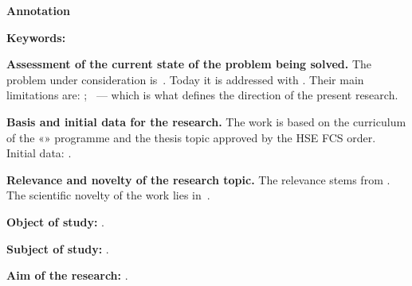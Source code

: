 \documentclass[12pt,a4paper]{extarticle}
\begin{document}
\sloppy



\begin{center}
  \textbf{\large Annotation}
\end{center}

\vspace{0.4em}

\noindent\textbf{Keywords:} 

\medskip
\noindent\textbf{Assessment of the current state of the problem being solved.} The problem under consideration is~. Today it is addressed with  \cite{example-en}. Their main limitations are: ; ~--- which is what defines the direction of the present research.

\medskip
\noindent\textbf{Basis and initial data for the research.} The work is based on the curriculum of the «\hseSpecialization» programme and the thesis topic approved by the HSE FCS order. Initial data: .

\medskip
\noindent\textbf{Relevance and novelty of the research topic.} The relevance stems from . The scientific novelty of the work lies in~.

\medskip
\noindent\textbf{Object of study:} .

\smallskip
\noindent\textbf{Subject of study:} .

\smallskip
\noindent\textbf{Aim of the research:} .
\end{document}
